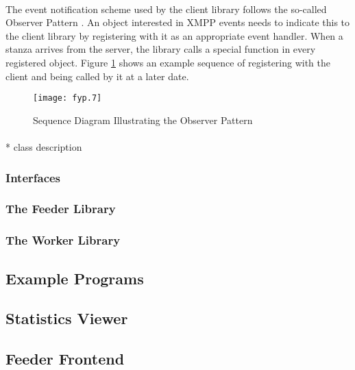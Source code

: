 \paragraph{}
The event notification scheme used by the client library follows the so-called Observer Pattern \cite{wikipedia003}. An object interested in XMPP events needs to indicate this to the client library by registering with it as an appropriate event handler. When a stanza arrives from the server, the library calls a special function in every registered object. Figure \ref{fig:observer1} shows an example sequence of registering with the client and being called by it at a later date.

\begin{figure}[H]
\begin{flushleft}
\texttt{[image: fyp.7]}
\end{flushleft}
\caption{Sequence Diagram Illustrating the Observer Pattern}
\label{fig:observer1}
\end{figure}

\paragraph{}
* class description

\subsubsection{Interfaces}
\paragraph{}

\subsubsection{The Feeder Library}
\paragraph{}

\subsubsection{The Worker Library}
\paragraph{}


\subsection{Example Programs}
\paragraph{}

\subsection{Statistics Viewer}
\paragraph{}

\subsection{Feeder Frontend}
\paragraph{}
